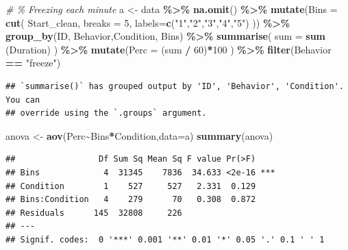 \documentclass[
]{book}
\newenvironment{Shaded}{\begin{snugshade}}{\end{snugshade}}
\newcommand{\AttributeTok}[1]{\textcolor[rgb]{0.13,0.29,0.53}{#1}}
\newcommand{\CommentTok}[1]{\textcolor[rgb]{0.56,0.35,0.01}{\textit{#1}}}
\newcommand{\DecValTok}[1]{\textcolor[rgb]{0.00,0.00,0.81}{#1}}
\newcommand{\FunctionTok}[1]{\textcolor[rgb]{0.13,0.29,0.53}{\textbf{#1}}}
\newcommand{\NormalTok}[1]{#1}
\newcommand{\OtherTok}[1]{\textcolor[rgb]{0.56,0.35,0.01}{#1}}
\newcommand{\SpecialCharTok}[1]{\textcolor[rgb]{0.81,0.36,0.00}{\textbf{#1}}}
\newcommand{\StringTok}[1]{\textcolor[rgb]{0.31,0.60,0.02}{#1}}
\begin{document}
\begin{Shaded}
\begin{Highlighting}[]
\CommentTok{\# \% Freezing each minute}
\NormalTok{a }\OtherTok{\textless{}{-}}\NormalTok{ data }\SpecialCharTok{\%\textgreater{}\%}
  \FunctionTok{na.omit}\NormalTok{() }\SpecialCharTok{\%\textgreater{}\%}
  \FunctionTok{mutate}\NormalTok{(}\AttributeTok{Bins =} \FunctionTok{cut}\NormalTok{(}
\NormalTok{    Start\_clean,}
    \AttributeTok{breaks =} \DecValTok{5}\NormalTok{,}
    \AttributeTok{labels=}\FunctionTok{c}\NormalTok{(}\StringTok{"1"}\NormalTok{,}\StringTok{"2"}\NormalTok{,}\StringTok{"3"}\NormalTok{,}\StringTok{"4"}\NormalTok{,}\StringTok{"5"}\NormalTok{)}
\NormalTok{  )) }\SpecialCharTok{\%\textgreater{}\%}
  \FunctionTok{group\_by}\NormalTok{(ID, Behavior,Condition, Bins) }\SpecialCharTok{\%\textgreater{}\%}
  \FunctionTok{summarise}\NormalTok{(}
    \AttributeTok{sum =} \FunctionTok{sum}\NormalTok{ (Duration)}
\NormalTok{  ) }\SpecialCharTok{\%\textgreater{}\%}
  \FunctionTok{mutate}\NormalTok{(}\AttributeTok{Perc =}\NormalTok{ (sum }\SpecialCharTok{/} \DecValTok{60}\NormalTok{)}\SpecialCharTok{*}\DecValTok{100}\NormalTok{ ) }\SpecialCharTok{\%\textgreater{}\%}
  \FunctionTok{filter}\NormalTok{(Behavior }\SpecialCharTok{==} \StringTok{"freeze"}\NormalTok{)}
\end{Highlighting}
\end{Shaded}

\begin{verbatim}
## `summarise()` has grouped output by 'ID', 'Behavior', 'Condition'. You can
## override using the `.groups` argument.
\end{verbatim}

\begin{Shaded}
\begin{Highlighting}[]
\NormalTok{anova }\OtherTok{\textless{}{-}} \FunctionTok{aov}\NormalTok{(Perc}\SpecialCharTok{\textasciitilde{}}\NormalTok{Bins}\SpecialCharTok{*}\NormalTok{Condition,}\AttributeTok{data=}\NormalTok{a)}
\FunctionTok{summary}\NormalTok{(anova)}
\end{Highlighting}
\end{Shaded}

\begin{verbatim}
##                 Df Sum Sq Mean Sq F value Pr(>F)    
## Bins             4  31345    7836  34.633 <2e-16 ***
## Condition        1    527     527   2.331  0.129    
## Bins:Condition   4    279      70   0.308  0.872    
## Residuals      145  32808     226                   
## ---
## Signif. codes:  0 '***' 0.001 '**' 0.01 '*' 0.05 '.' 0.1 ' ' 1
\end{verbatim}
\end{document}
